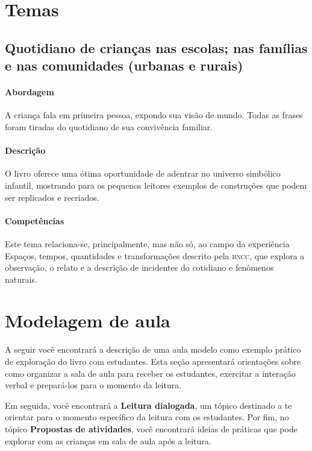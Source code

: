 \documentclass[11pt]{extarticle}
\begin{document}
\section{Temas}


\subsection{Quotidiano de crianças nas escolas; nas famílias e nas comunidades (urbanas e rurais)}

\paragraph{Abordagem} A criança fala em primeira pessoa, expondo sua visão de mundo.
Todas as frases foram tiradas do quotidiano de sua convivência familiar.

\paragraph{Descrição} O livro oferece uma ótima oportunidade de adentrar no
universo simbólico infantil, mostrando para os pequenos leitores exemplos 
de construções que podem ser replicados e recriados.

\paragraph{Competências} Este tema relaciona-se, principalmente, mas não só, 
ao campo da experiência Espaços, tempos, quantidades e transformações
descrito pela \textsc{bncc}, que explora a observação, o relato e a descrição 
de incidentes do cotidiano e fenômenos naturais.


\section{Modelagem de aula}
A seguir você encontrará a descrição de uma aula modelo como exemplo 
prático de exploração do livro com estudantes. Esta seção apresentará 
orientações sobre como organizar a sala de aula para receber os 
estudantes, exercitar a interação verbal e prepará-los para o 
momento da leitura.

Em seguida, você encontrará a \textbf{Leitura dialogada}, um 
tópico destinado a te orientar para o momento específico da 
leitura com os estudantes. Por fim, no tópico 
\textbf{Propostas de atividades}, você encontrará ideias 
de práticas que pode explorar com as crianças em sala de 
aula após a leitura. 
\end{document}
